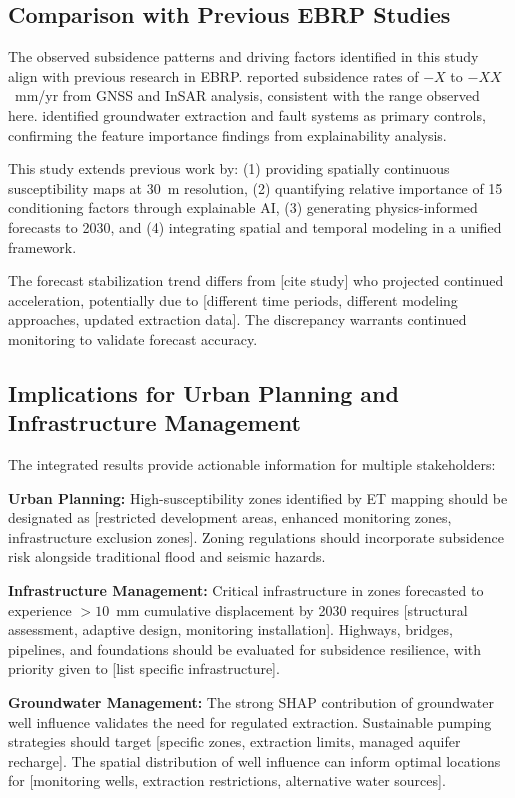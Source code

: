 \subsection{Comparison with Previous EBRP Studies}

The observed subsidence patterns and driving factors identified in this study align with previous research in EBRP. \citet{Abdalla2024} reported subsidence rates of $-X$ to $-XX$~mm/yr from GNSS and InSAR analysis, consistent with the range observed here. \citet{Zou2016} identified groundwater extraction and fault systems as primary controls, confirming the feature importance findings from explainability analysis.

This study extends previous work by: (1) providing spatially continuous susceptibility maps at 30~m resolution, (2) quantifying relative importance of 15 conditioning factors through explainable AI, (3) generating physics-informed forecasts to 2030, and (4) integrating spatial and temporal modeling in a unified framework.

The forecast stabilization trend differs from [cite study] who projected continued acceleration, potentially due to [different time periods, different modeling approaches, updated extraction data]. The discrepancy warrants continued monitoring to validate forecast accuracy.

\subsection{Implications for Urban Planning and Infrastructure Management}

The integrated results provide actionable information for multiple stakeholders:

\textbf{Urban Planning:} High-susceptibility zones identified by ET mapping should be designated as [restricted development areas, enhanced monitoring zones, infrastructure exclusion zones]. Zoning regulations should incorporate subsidence risk alongside traditional flood and seismic hazards.

\textbf{Infrastructure Management:} Critical infrastructure in zones forecasted to experience $>10$~mm cumulative displacement by 2030 requires [structural assessment, adaptive design, monitoring installation]. Highways, bridges, pipelines, and foundations should be evaluated for subsidence resilience, with priority given to [list specific infrastructure].

\textbf{Groundwater Management:} The strong SHAP contribution of groundwater well influence validates the need for regulated extraction. Sustainable pumping strategies should target [specific zones, extraction limits, managed aquifer recharge]. The spatial distribution of well influence can inform optimal locations for [monitoring wells, extraction restrictions, alternative water sources].

